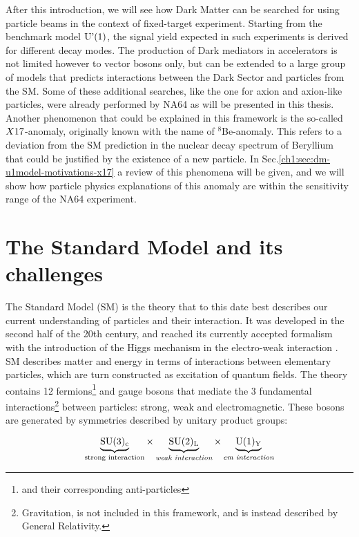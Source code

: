 After this introduction, we will see how Dark Matter can be searched for using particle beams in the context of fixed-target experiment. Starting from the benchmark model $\textrm{U'(1)}$, the signal yield expected in such experiments is derived for different decay modes. The production of Dark mediators in accelerators is not limited however to vector bosons only, but can be extended to a large group of models that predicts interactions between the Dark Sector and particles from the SM. Some of these additional searches, like the one for axion and axion-like particles, were already performed by NA64 as will be presented in this thesis.
Another phenomenon that could be explained in this framework is the so-called $X17$-anomaly, originally known with the name of $^8$Be-anomaly. This refers to a deviation from the SM prediction in the nuclear decay spectrum of Beryllium that could be justified by the existence of a new particle. In Sec.\ref{ch1:sec:dm-u1model-motivations-x17} a review of this phenomena will be given, and we will show how particle physics explanations of this anomaly are within the sensitivity range of the NA64 experiment.


\section{The Standard Model and its challenges}
\label{ch1:sec:sm-puzzles}

The Standard Model (SM) is the theory that to this date best describes our current understanding of particles and their interaction. It was developed in the second half of the 20th century, and reached its currently accepted formalism with the introduction of the Higgs mechanism \cite{PhysRevLett.13.508} in the electro-weak interaction \cite{PhysRevLett.19.1264}. SM describes matter and energy in terms of interactions between elementary particles, which are turn constructed as excitation of quantum fields. The theory contains 12 fermions\footnote{and their corresponding anti-particles} and gauge bosons that mediate the 3 fundamental interactions\footnote{Gravitation, is not included in this framework, and is instead described by General Relativity.} between particles: strong, weak and electromagnetic. These bosons are generated by symmetries described by unitary product groups:

\begin{equation}
    \label{eq:sm-group}
    \underbrace{\rm{SU(3)_c}}_{\textrm{strong interaction}} \times \underbrace{\rm{SU(2)_L}}_{\textit{weak interaction}} \times \underbrace{\rm{U(1)_Y}}_{\textit{em interaction}}
\end{equation}

